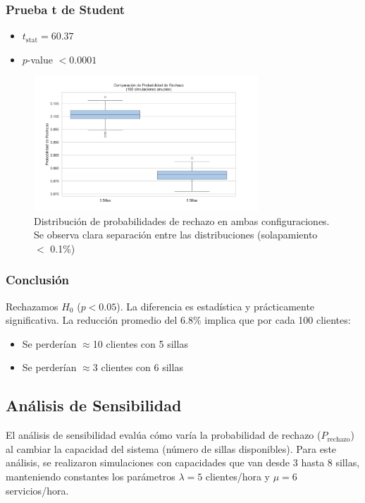 \documentclass{article}
\begin{document}
\subsubsection{Prueba t de Student}
\begin{itemize}
    \item $t_{\text{stat}} = 60.37$
    \item $p$-value $< 0.0001$
\end{itemize}

\begin{figure}[H]
    \centering
    \includegraphics[width=0.75\textwidth]{../images/hipotesis_rechazo.png}
    \caption{Distribución de probabilidades de rechazo en ambas configuraciones. Se observa clara separación entre las distribuciones (solapamiento $<$ 0.1\%)}
    \label{fig:hipotesis}
\end{figure}

\subsubsection{Conclusión} 
Rechazamos $H_0$ ($p < 0.05$). La diferencia es estadística y prácticamente significativa. La reducción promedio del 6.8\% implica que por cada 100 clientes:
\begin{itemize}
    \item Se perderían $\approx$10 clientes con 5 sillas
    \item Se perderían $\approx$3 clientes con 6 sillas
\end{itemize}

\subsection{Análisis de Sensibilidad}

El análisis de sensibilidad evalúa cómo varía la probabilidad de rechazo (\(P_{\text{rechazo}}\))
al cambiar la capacidad del sistema (número de sillas disponibles). Para este análisis, se realizaron
simulaciones con capacidades que van desde 3 hasta 8 sillas, manteniendo constantes los parámetros
\(\lambda = 5\) clientes/hora y \(\mu = 6\) servicios/hora.
\end{document}
